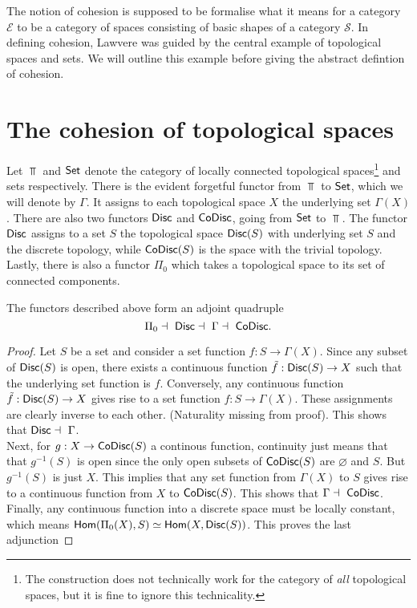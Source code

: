 The notion of cohesion is supposed to be formalise what it means for a category $\mathcal{E}$ to be a category of spaces consisting of basic shapes of a category $\mathcal{S}$.
In defining cohesion, Lawvere was guided by the central example of topological spaces and sets. We will outline this example before giving the abstract defintion of cohesion.\\

\section{The cohesion of topological spaces}
Let $\Top$ and $\mathsf{Set}$ denote the category of locally connected topological spaces\footnote{The construction does not technically work for the category of \textit{all} topological spaces, but it is fine to ignore this technicality.} and sets respectively. There is the evident forgetful functor from $\Top$ to $\mathsf{Set}$, which we will denote by $\Gamma$. It assigns to each topological space $X$ the underlying set $\Gamma(X)$. There are also two functors $\mathsf{Disc}$ and $\mathsf{CoDisc}$, going from $\mathsf{Set}$ to $\Top$. The functor $\mathsf{Disc}$ assigns to a set $S$ the topological space $\mathsf{Disc}(S)$ with underlying set $S$ and the discrete topology, while $\mathsf{CoDisc}(S)$ is the space with the trivial topology. Lastly, there is also a functor $\Pi_0$ which takes a topological space to its set of connected components.
\begin{proposition}
  The functors described above form an adjoint quadruple \[\Pi_0 \dashv\ \Disc \dashv\ \Gamma \dashv\ \CoDisc.\]
\end{proposition}
\begin{proof}
  Let $S$ be a set and consider a set function $f: S \to \Gamma(X)$. Since any subset of $\mathsf{Disc}(S)$ is open, there exists a continuous function $\tilde{f}: \mathsf{Disc}(S) \to X$ such that the underlying set function is $f$. Conversely, any continuous function $\tilde{f} : \mathsf{Disc}(S) \to X$ gives rise to a set function $ f: S \to \Gamma(X)$. These assignments are clearly inverse to each other. (Naturality missing from proof). This shows that $\Disc \dashv\ \Gamma$.\\
  Next, for $g: X \to \mathsf{CoDisc}(S)$ a continous function, continuity just means that that $g^{-1}(S)$ is open since the only open subsets of $\mathsf{CoDisc}(S)$ are $\varnothing$ and $S$.
  But $g^{-1}(S)$ is just $X$. This implies that any set function from $\Gamma(X)$ to $S$ gives rise to a continuous function from $X$ to $\mathsf{CoDisc}(S)$. This shows that $\Gamma \dashv\ \mathsf{CoDisc}$.\\
  Finally, any continuous function into a discrete space must be locally constant, which means $\mathsf{Hom}(\Pi_0(X), S) \simeq \mathsf{Hom}(X, \mathsf{Disc}(S))$. This proves the last adjunction
\end{proof}

